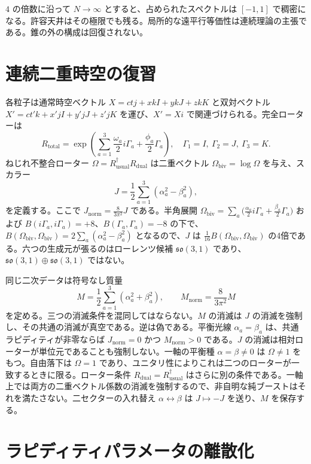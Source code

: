 \documentclass[a4paper]{article}
\theoremstyle{definition}
\newcommand{\Jnorm}{J_{\mathrm{norm}}}
\newcommand{\Mnorm}{M_{\mathrm{norm}}}
\begin{document}
$4$ の倍数に沿って $N\to\infty$ とすると、占められたスペクトルは $[-1,1]$ で稠密になる。許容天井はその極限でも残る。局所的な遠平行等価性は連続理論の主張である。錐の外の構成は回復されない。

\section{連続二重時空の復習}
\label{sec:review}

各粒子は通常時空ベクトル $X = ct j + x kI + y kJ + z kK$ と双対ベクトル $X' = ct' k + x' jI + y' jJ + z' jK$ を運び、$X' = Xi$ で関連づけられる。完全ローターは
\[
R_\text{total} = \exp\left( \sum_{a=1}^3 \frac{\omega_a}{2} i\Gamma_a + \frac{\phi_a}{2} \Gamma_a \right), \quad \Gamma_1 = I,\ \Gamma_2 = J,\ \Gamma_3 = K.
\]
ねじれ不整合ローター $\Omega = R_\text{usual}^\dagger R_\text{dual}$ は二重ベクトル $\Omega_\text{biv} = \log \Omega$ を与え、スカラー
\[
J = \frac12\sum_{a=1}^3(\alpha_a^2-\beta_a^2),
\]
を定義する。ここで $\Jnorm=\frac8{3\pi^2}J$ である。半角展開 $\Omega_\text{biv}=\sum_a\bigl(\frac{\alpha_a}{2}i\Gamma_a+\frac{\beta_a}{2}\Gamma_a\bigr)$ および $B(i\Gamma_a,i\Gamma_a)=+8$、$B(\Gamma_a,\Gamma_a)=-8$ の下で、$B(\Omega_\text{biv},\Omega_\text{biv})=2\sum_a(\alpha_a^2-\beta_a^2)$ となるので、$J$ は $\frac1{16}B(\Omega_\text{biv},\Omega_\text{biv})$ の4倍である。六つの生成元が張るのはローレンツ候補 $\mathfrak{so}(3,1)$ であり、$\mathfrak{so}(3,1)\oplus\mathfrak{so}(3,1)$ ではない。

同じ二次データは符号なし質量
\[
M = \frac12\sum_{a=1}^3(\alpha_a^2+\beta_a^2),\qquad \Mnorm=\frac8{3\pi^2}M
\]
を定める。三つの消滅条件を混同してはならない。$M$ の消滅は $J$ の消滅を強制し、その共通の消滅が真空である。逆は偽である。平衡光線 $\alpha_a=\beta_a$ は、共通ラピディティが非零ならば $\Jnorm=0$ かつ $\Mnorm>0$ である。$J$ の消滅は相対ローターが単位元であることも強制しない。一軸の平衡種 $\alpha=\beta\neq 0$ は $\Omega\neq 1$ をもつ。自由落下は $\Omega=1$ であり、ユニタリ性によりこれは二つのローターが一致するときに限る。ローター条件 $R_{\mathrm{dual}}=R_{\mathrm{usual}}^\dagger$ はさらに別の条件である。一軸上では両方の二重ベクトル係数の消滅を強制するので、非自明な純ブーストはそれを満たさない。二セクターの入れ替え $\alpha\leftrightarrow\beta$ は $J\mapsto -J$ を送り、$M$ を保存する。

\section{ラピディティパラメータの離散化}
\label{sec:discretization}
\end{document}

